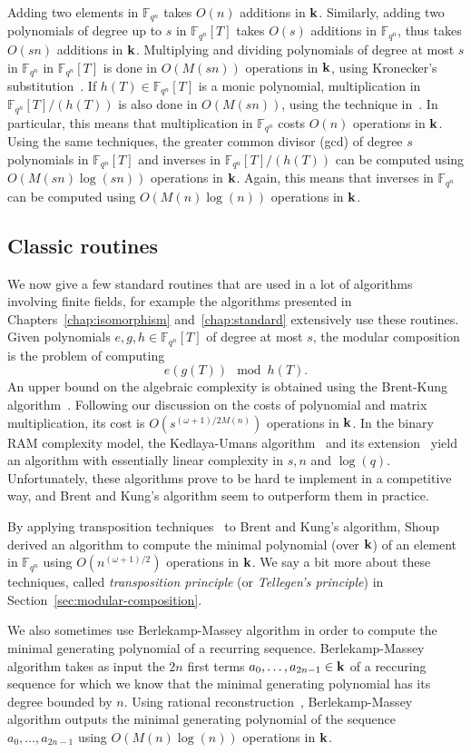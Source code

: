 Adding two elements in $\mathbb{F}_{q^n}$ takes $O(n)$ additions in $\mathbf{k}$.
Similarly, adding two polynomials of degree up to $s$ in $\mathbb{F}_{q^n}\left[
T \right]$ takes $O(s)$ additions in $\mathbb{F}_{q^n}$, thus takes $O(sn)$
additions in $\mathbf{k}$. Multiplying and dividing polynomials of degree at most $s$ in
$\mathbb{F}_{q^n}$ in $\mathbb{F}_{q^n}\left[ T \right]$ is done in $O(M(sn))$
operations in $\mathbf{k}$, using Kronecker's substitution~\cite{Moenck76, Kaltofen87,
GG13, GS92, Harvey09}. If $h(T)\in\mathbb{F}_{q^n}[T]$ is a monic polynomial,
multiplication in $\mathbb{F}_{q^n}[T]/(h(T))$ is also done in $O(M(sn))$, using
the technique in~\cite{PS06}. In particular, this means that multiplication in
$\mathbb{F}_{q^n}$ costs $O(n)$ operations in $\mathbf{k}$. Using the same techniques,
the greater common divisor (gcd) of degree $s$ polynomials in
$\mathbb{F}_{q^n}[T]$ and inverses in $\mathbb{F}_{q^n}[T]/(h(T))$ can be
computed using $O(M(sn)\log(sn))$ operations in $\mathbf{k}$. Again, this means that
inverses in $\mathbb{F}_{q^n}$ can be computed using $O(M(n)\log(n))$
operations in $\mathbf{k}$.

\subsection{Classic routines}

We now give a few standard routines that are used in a lot of algorithms
involving finite fields, for example the algorithms presented in
Chapters~\ref{chap:isomorphism} and~\ref{chap:standard} extensively use these
routines.
Given polynomials $e, g, h\in\mathbb{F}_{q^n}[T]$ of degree at most $s$, the
modular composition is the problem of computing
\[
  e(g(T))\mod h(T).
\]
An upper bound on the algebraic complexity is obtained using the Brent-Kung
algorithm~\cite{BK78}. Following our discussion on the costs of polynomial
and matrix multiplication, its cost is $O(s^{(\omega+1)/2M(n)})$ operations in
$\mathbf{k}$. In the binary RAM complexity model, the Kedlaya-Umans
algorithm~\cite{KU11} and its extension~\cite{PS13} yield an algorithm with
essentially linear complexity in $s, n$ and $\log(q)$. Unfortunately, these
algorithms prove to be hard te implement in a competitive way, and Brent and
Kung's algorithm seem to outperform them in practice.

By applying transposition techniques~\cite{BLS03, DeFeo10, DS10, BCS13} to Brent
and Kung's algorithm, Shoup~\cite{Shoup94, Shoup99} derived an algorithm to
compute the minimal polynomial (over $\mathbf{k}$) of an element in $\mathbb{F}_{q^n}$
using $O(n^{(\omega+1)/2})$ operations in $\mathbf{k}$. We say a bit more about these
techniques, called \emph{transposition principle} (or \emph{Tellegen's
principle}) in Section~\ref{sec:modular-composition}.

We also sometimes use Berlekamp-Massey algorithm in order to compute the minimal
generating polynomial of a recurring sequence. Berlekamp-Massey algorithm takes
as input the $2n$ first terms $a_0, \dots, a_{2n-1}\in\mathbf{k}$ of a reccuring
sequence for which we know that the minimal generating polynomial has its degree
bounded by $n$. Using rational reconstruction~\cite[Chapter 7]{BCGLLSS17},
Berlekamp-Massey algorithm outputs the minimal generating polynomial of the
sequence $a_0, \dots, a_{2n-1}$ using $O(M(n)\log(n))$ operations in $\mathbf{k}$.
